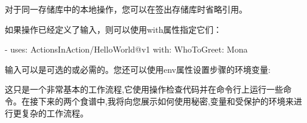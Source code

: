 对于同一存储库中的本地操作，您可以在签出存储库时省略引用。

如果操作已经定义了输入，则可以使用with属性指定它们：

\begin{shell}
- uses: ActionsInAction/HelloWorld@v1
  with:
    WhoToGreet: Mona
\end{shell}

输入可以是可选的或必需的。您还可以使用env属性设置步骤的环境变量:



这只是一个非常基本的工作流程,它使用操作检查代码并在命令行上运行一些命令。在接下来的两个食谱中,我将向您展示如何使用秘密,变量和受保护的环境来进行更复杂的工作流程。